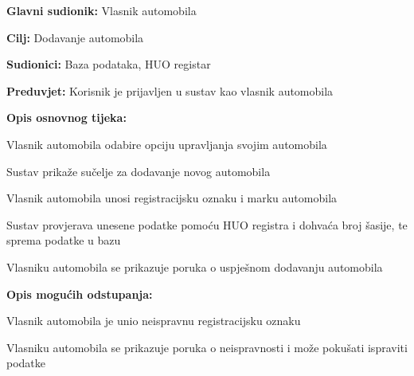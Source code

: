 \noindent {}
\begin{packed_item}

	\item \textbf{Glavni sudionik: } Vlasnik automobila
	\item  \textbf{Cilj:} Dodavanje automobila
	\item  \textbf{Sudionici:} Baza podataka, HUO registar
	\item  \textbf{Preduvjet:} Korisnik je prijavljen u sustav kao vlasnik automobila
	\item  \textbf{Opis osnovnog tijeka:}

	\item[] \begin{packed_enum}

		\item Vlasnik automobila odabire opciju upravljanja svojim automobila
		\item Sustav prikaže sučelje za dodavanje novog automobila
		\item Vlasnik automobila unosi registracijsku oznaku i marku automobila
		\item Sustav provjerava unesene podatke pomoću HUO registra i dohvaća broj šasije, te sprema podatke u bazu
		\item Vlasniku automobila se prikazuje poruka o uspješnom dodavanju automobila

	\end{packed_enum}

	\item  \textbf{Opis mogućih odstupanja:}

	\item[] \begin{packed_item}

		\item[4.a] Vlasnik automobila je unio neispravnu registracijsku oznaku
		\item[] \begin{packed_enum}

			\item Vlasniku automobila se prikazuje poruka o neispravnosti i može
			pokušati ispraviti podatke

		\end{packed_enum}

	\end{packed_item}
\end{packed_item}

